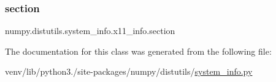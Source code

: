 \subsubsection{\texorpdfstring{section}{section}}
{\footnotesize\ttfamily numpy.\+distutils.\+system\+\_\+info.\+x11\+\_\+info.\+section\hspace{0.3cm}{\ttfamily [static]}}



The documentation for this class was generated from the following file\+:\begin{DoxyCompactItemize}
\item 
venv/lib/python3./site-\/packages/numpy/distutils/\hyperlink{system__info_8py}{system\+\_\+info.\+py}\end{DoxyCompactItemize}
